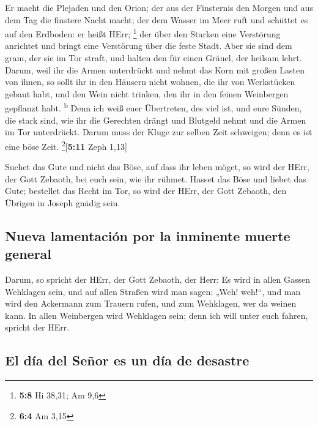  Er macht die Plejaden und den Orion; der aus der
Finsternis den Morgen und aus dem Tag die finstere Nacht macht; der dem
Wasser im Meer ruft und schüttet es auf den Erdboden: er heißt HErr;
\footnote{\textbf{5:8} Hi 38,31; Am 9,6}  der über den
Starken eine Verstörung anrichtet und bringt eine Verstörung über die
feste Stadt.  Aber sie sind dem gram, der sie im Tor
straft, und halten den für einen Gräuel, der heilsam lehrt.
 Darum, weil ihr die Armen unterdrückt und nehmt das Korn
mit großen Lasten von ihnen, so sollt ihr in den Häusern nicht wohnen,
die ihr von Werkstücken gebaut habt, und den Wein nicht trinken, den ihr
in den feinen Weinbergen gepflanzt habt. \textsuperscript{b}
 Denn ich weiß euer Übertreten, des viel ist, und eure
Sünden, die stark sind, wie ihr die Gerechten drängt und Blutgeld nehmt
und die Armen im Tor unterdrückt.  Darum muss der Kluge
zur selben Zeit schweigen; denn es ist eine böse Zeit.
\footnote{\textbf{6:4} Am 3,15}{[}\textbf{5:11} Zeph 1,13{]}

 Suchet das Gute und nicht das Böse, auf dass ihr leben
möget, so wird der HErr, der Gott Zebaoth, bei euch sein, wie ihr
rühmet.  Hasset das Böse und liebet das Gute; bestellet
das Recht im Tor, so wird der HErr, der Gott Zebaoth, den Übrigen in
Joseph gnädig sein.

\hypertarget{nueva-lamentaciuxf3n-por-la-inminente-muerte-general}{%
\subsection{Nueva lamentación por la inminente muerte
general}\label{nueva-lamentaciuxf3n-por-la-inminente-muerte-general}}

 Darum, so spricht der HErr, der Gott Zebaoth, der Herr:
Es wird in allen Gassen Wehklagen sein, und auf allen Straßen wird man
sagen: „Weh! weh!{}``, und man wird den Ackermann zum Trauern rufen, und
zum Wehklagen, wer da weinen kann.  In allen Weinbergen
wird Wehklagen sein; denn ich will unter euch fahren, spricht der HErr.

\hypertarget{el-duxeda-del-seuxf1or-es-un-duxeda-de-desastre}{%
\subsection{El día del Señor es un día de
desastre}\label{el-duxeda-del-seuxf1or-es-un-duxeda-de-desastre}}

